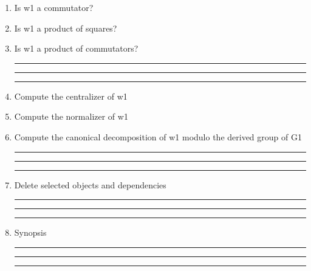 \begin{enumerate}
\item Is w1 a commutator?

\item Is w1 a product of squares?

\item Is w1 a product of commutators?


\bigskip
\hrule\hrule\hrule

\item Compute the centralizer of w1

\item Compute the normalizer of w1

\item Compute the canonical decomposition of w1 modulo the derived
group of G1

\bigskip
\hrule\hrule\hrule

\item Delete selected objects and dependencies

\bigskip
\hrule\hrule\hrule

\item
Synopsis

\bigskip
\hrule\hrule\hrule

\end{enumerate}
